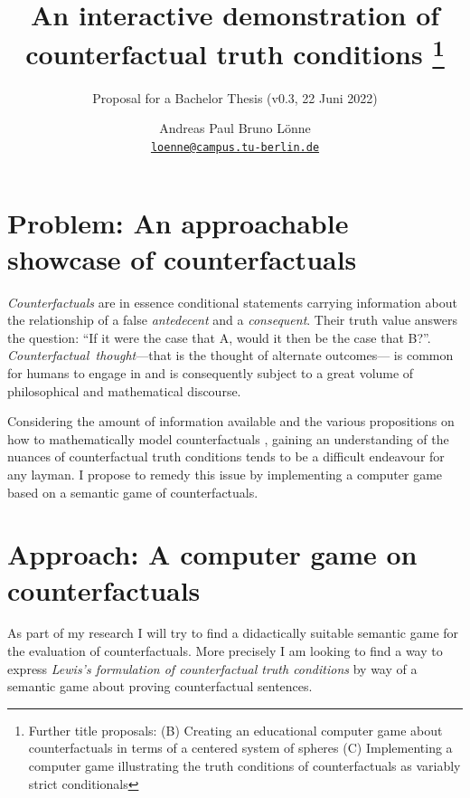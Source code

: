 \documentclass[a4paper,american]{paper}
\providecommand*{\code}[1]{\texttt{#1}}
\begin{document}
\title{An interactive demonstration of counterfactual truth conditions%
	\footnote{Further title proposals:
		(B) Creating an educational computer game about counterfactuals in terms of a centered system of spheres
		(C) Implementing a computer game illustrating the truth conditions of counterfactuals as variably strict conditionals
	}
}

\subtitle{Proposal for a Bachelor Thesis (v0.3, 22 Juni 2022)}

\author{%
	Andreas Paul Bruno Lönne\\
	\code{\href{mailto:loenne@campus.tu-berlin.de}{loenne@campus.tu-berlin.de}}
}


\maketitle

\section*{Problem: An approachable showcase of counterfactuals}
{\it Counterfactuals} are in essence conditional statements carrying information about the relationship of a false {\it antedecent} and a {\it consequent}. Their truth value answers the question: ``If it were the case that A, would it then be the case that B?''. {\it Counterfactual~thought}---that is the thought of alternate outcomes---\cite{byrne_counterfactual_thought_2016} is common for humans to engage in and is consequently subject to a great volume of philosophical and mathematical discourse. 

Considering the amount of information available and the various propositions on how to mathematically model counterfactuals \cite{stalnaker_theory_1968, stalnaker_semantic_1970,  lewis_counterfactuals_1973}, gaining an understanding of the nuances of counterfactual truth conditions tends to be a difficult endeavour for any layman. I propose to remedy this issue by implementing a computer game based on a semantic game of counterfactuals.

\section*{Approach: A computer game on counterfactuals}
As part of my research I will try to find a didactically suitable semantic game for the evaluation of counterfactuals. More precisely I am looking to find a way to express {\it Lewis's formulation of counterfactual truth conditions} \cite{lewis_counterfactuals_1973} by way of a semantic game about proving counterfactual sentences.
\end{document}
